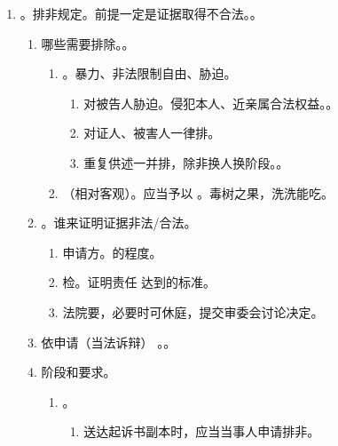 \begin{enumerate}
\begin{enumerate}
        \end{enumerate}
  \item {}。排非规定。前提一定是证据取得不合法。。
        \begin{enumerate}
          \item 哪些需要排除。。
                \begin{enumerate}
                  \item {}。暴力、非法限制自由、胁迫。
                        \begin{enumerate}
                          \item 对被告人胁迫。侵犯本人、近亲属合法权益。。
                          \item 对证人、被害人一律排。
                          \item 重复供述一并排，除非换人换阶段。。
                        \end{enumerate}
                  \item {}（相对客观）。应当予以 \yjt {}。毒树之果，洗洗能吃。
                \end{enumerate}
          \item {}。谁来证明证据非法/合法。
                \begin{enumerate}
                  \item 申请方。的程度。
                  \item 检。证明责任 \yjt 达到的标准。
                  \item 法院要，必要时可休庭，提交审委会讨论决定。
                \end{enumerate}
          \item 依申请（当法诉辩） \hz {}。。
          \item 阶段和要求。
                \begin{enumerate}
                  \item {}。
                        \begin{enumerate}
                          \item 送达起诉书副本时，应当当事人申请排非。

\end{enumerate}
\end{enumerate}
\end{enumerate}
\end{enumerate}
